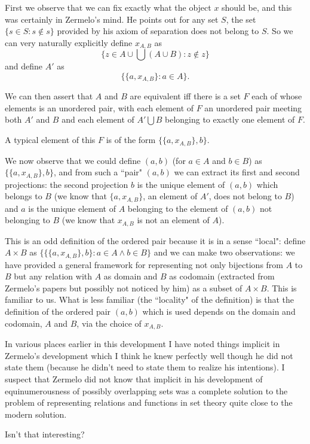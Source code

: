 \documentclass{slides}
\begin{document}
\begin{slide}

First we observe that we can fix exactly what the object $x$ should be, and this was certainly in Zermelo's mind.  He points out for any set $S$, the set $\{s \in S: s \not\in s\}$ provided by his axiom of separation does not belong to $S$.  So we can very naturally explicitly define $x_{A,B}$ as $$\{z \in A \cup \bigcup(A \cup B):z \not\in z\}$$ and
define $A'$ as $$\{\{a,x_{A,B}\}:a \in A\}.$$

We can then assert that $A$ and $B$ are equivalent iff there is a set $F$ each of whose elements is an unordered pair, with each element of $F$ an unordered pair meeting both $A'$ and $B$  and each
element of $A' \bigcup B$ belonging to exactly one element of $F$.

\end{slide}

\begin{slide}

A typical element of this $F$ is of the form $\{\{a,x_{A,B}\},b\}$.

We now observe that we could define $(a,b)$ (for $a \in A$ and $b\in B$) as $\{\{a,x_{A,B}\},b\}$, and from such a ``pair" $(a,b)$ we can extract its first and second projections:
the second projection $b$ is the unique element of $(a,b)$ which belongs to $B$ (we know that $\{a,x_{A,B}\}$, an element of $A'$, does not belong to $B$) and $a$ is
the unique element of $A$ belonging to the element of $(a,b)$ not belonging to $B$ (we know that $x_{A,B}$ is not an element of $A$).

\end{slide}

\begin{slide}

This is an odd definition of the ordered pair because it is in a sense ``local":  define $A \times B$ as $\{\{\{a,x_{A,B}\},b\}:a \in A \wedge b \in B\}$ and we can make two observations:
we have provided a general framework for representing not only bijections from $A$ to $B$ but any relation with $A$ as domain and $B$ as codomain (extracted from Zermelo's papers but possibly  not noticed by him) as a subset of $A \times B$.  This is familiar to us.  What is less familiar (the ``locality" of the definition) is that the definition of the
ordered pair $(a,b)$ which is used depends on the domain and codomain, $A$ and $B$, via the choice of $x_{A,B}$.


\end{slide}

\begin{slide}

In various places earlier in this development I have noted things implicit in Zermelo's development which I think he knew perfectly well though he did not state them (because he didn't  need to state them to realize his intentions).  I suspect that Zermelo did not know that implicit in his development of equinumerousness of possibly overlapping sets was a complete solution to the problem of representing relations and functions in set theory quite close to the modern solution.

Isn't that interesting?


\end{slide}
\end{document}

